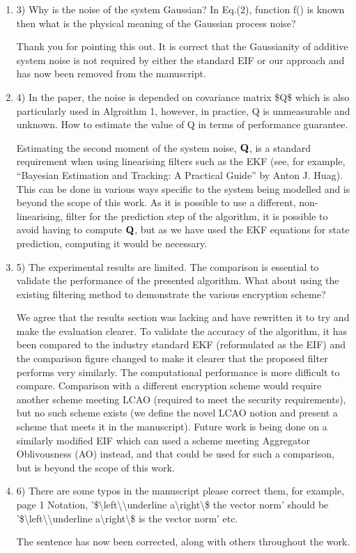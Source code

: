\documentclass[a4paper]{scrartcl}
\newenvironment{rebuttal}{\begin{enumerate}[label={\color{grey}\thesection.\arabic{enumi}},leftmargin=0pt,ref=\thesection.\arabic{enumi}]}{\end{enumerate}}
\newcommand{\reviewtext}[1]{{\color{nblue} #1}}
\begin{document}
\begin{rebuttal}
\item \reviewtext{3) Why is the noise of the system Gaussian? In Eq.(2), function f() is known then what is the physical meaning of the Gaussian process noise?}

Thank you for pointing this out. It is correct that the Gaussianity of additive system noise is not required by either the standard EIF or our approach and has now been removed from the manuscript.

\item \reviewtext{4) In the paper, the noise is depended on covariance matrix \$Q\$ which is also particularly used in Algroithm 1, however, in practice, Q is unmeasurable and unknown. How to estimate the value of Q in terms of performance guarantee.}

Estimating the second moment of the system noise, ${{\mathbf{Q}}}$, is a standard requirement when using linearising filters such as the EKF (see, for example, ``Bayesian Estimation and Tracking: A Practical Guide'' by Anton J. Huag). This can be done in various ways specific to the system being modelled and is beyond the scope of this work. As it is possible to use a different, non-linearising, filter for the prediction step of the algorithm, it is possible to avoid having to compute ${{\mathbf{Q}}}$, but as we have used the EKF equations for state prediction, computing it would be necessary.

\item \reviewtext{5) The experimental results are limited. The comparison is essential to validate the performance of the presented algorithm. What about using the existing filtering method to demonstrate the various encryption scheme?}

We agree that the results section was lacking and have rewritten it to try and make the evaluation clearer. To validate the accuracy of the algorithm, it has been compared to the industry standard EKF (reformulated as the EIF) and the comparison figure changed to make it clearer that the proposed filter performs very similarly. The computational performance is more difficult to compare. Comparison with a different encryption scheme would require another scheme meeting LCAO (required to meet the security requirements), but no such scheme exists (we define the novel LCAO notion and present a scheme that meets it in the manuscript). Future work is being done on a similarly modified EIF which can used a scheme meeting Aggregator Oblivousness (AO) instead, and that could be used for such a comparison, but is beyond the scope of this work.

\item \reviewtext{6) There are some typos in the manuscript please correct them, for example, page 1 Notation, '\$\textbackslash left\textbackslash\textbar\textbackslash underline a\textbackslash right\textbackslash\textbar\$ the vector norm' should be '\$\textbackslash left\textbackslash\textbar\textbackslash underline a\textbackslash right\textbackslash\textbar\$ is the vector norm' etc.}

The sentence has now been corrected, along with others throughout the work.

\end{rebuttal}

% 
\end{document}
